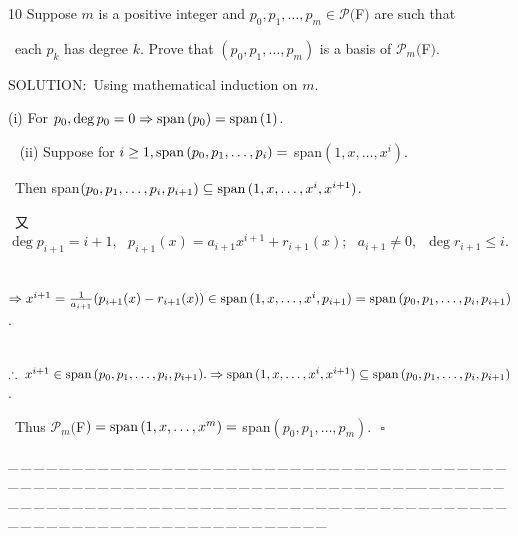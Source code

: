 \documentclass[a4paper, 11pt, UTF8]{article}
\def\Spn{\textup{span}\,}
\def\Po{\mathcal{P}}
\begin{document}
\begin{large}
{\timesbf\Large 10} {\timessl\Large 
Suppose $m$ is a positive integer and $p_0,p_1,\dots,p_m\in\Po(${\timesbf F}$)$ are such that }\par\quad\,
{\timessl\Large each $p_k$ has degree $k$. Prove that $(p_0,p_1,\dots,p_m)$ is a basis of $\Po_m(${\timesbf F}$)$.
}\par
{\timesbf S\footnotesize{OLUTION:}}\,\,\,Using mathematical induction on $m$.\par\quad\Large
(i) {For $p_0, \deg p_0=0\Rightarrow\Spn(p_0)=\Spn(1)$.}\par\,\,\,
(ii) {Suppose for $i\geq 1,\Spn(p_0,p_1,\dots,p_i)=$ span$(1,x,\dots,x^i)$.}\par\qquad\,
{Then span$(p_0,p_1,\dots,p_i,p_{i+1})\subseteq\Spn(1,x,\dots,x^i,x^{i+1})$.}\par\qquad\,
又 $\deg p_{i+1}=i+1,\,\,\,\,p_{i+1}(x)=a_{i+1}x^{i+1}+r_{i+1}(x);\,\,\,\,a_{i+1}\neq 0,\,\,\,\deg r_{i+1}\leq i.$
\par\qquad\,
{$\Rightarrow x^{i+1}=\frac{1}{a_{i+1}}(p_{i+1}(x)-r_{i+1}(x))\in\Spn(1,x,\dots,x^i,p_{i+1})=\Spn(p_0,p_1,\dots,p_i,p_{i+1})$.}\par\qquad\,
{$\therefore\,\,x^{i+1}\in\Spn(p_0,p_1,\dots,p_i,p_{i+1}).\Rightarrow\Spn(1,x,\dots,x^i,x^{i+1})\subseteq\Spn(p_0,p_1,\dots,p_i,p_{i+1})$.}\par\qquad\,
Thus $\Po_m(${\timesbf F}$)=\Spn(1,x,\dots,x^{m})=$ span$(p_0,p_1,\dots,p_{m}).\,\,\,\,\square$\par\large
{\tiny \_\,\_\,\_\,\_\,\_\,\_\,\_\,\_\,\_\,\_\,\_\,\_\,\_\,\_\,\_\,\_\,\_\,\_\,\_\,\_\,\_\,\_\,\_\,\_\,\_\,\_\,\_\,\_\,\_\,\_\,\_\,\_\,\_\,\_\,\_\,\_\,\_\,\_\,\_\,\_\,\_\,\_\,\_\,\_\,\_\,\_\,\_\,\_\,\_\,\_\,\_\,\_\,\_\,\_\,\_\,\_\,\_\,\_\,\_\,\_\,\_\,\_\,\_\,\_\,\_\,\_\,\_\,\_\,\_\,\_\,\_\_\,\_\,\_\,\_\,\_\,\_\,\_\,\_\,\_\,\_\,\_\,\_\,\_\,\_\,\_\,\_\,\_\,\_\,\_\,\_\,\_\,\_\,\_\,\_\,\_\,\_\,\_\,\_\,\_\,\_\,\_\,\_\,\_\,\_\,\_\,\_\,\_\,\_\,\_\,\_\,\_\,\_\,\_\,\_\,\_\,\_\,\_\,\_\,\_\,\_\,\_\,\_\,\_\,\_\,\_\,\_\,\_\,\_\,\_\,\_\,\_\,\_\,\_\,\_\,\_\,\_\,\_\,\_\,\_\,\_\,\_}\par


\end{large}
\end{document}
